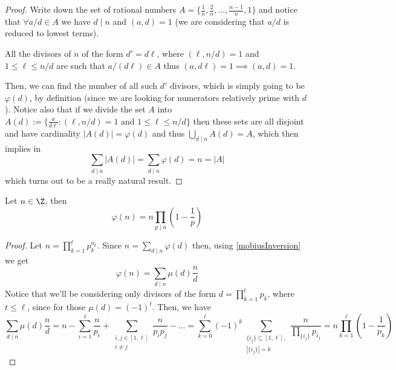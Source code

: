 \begin{proof}
   Write down the set of rational numbers \(A = \{\frac{1}{n}, \frac{2}{n},
   \dots, \frac{n-1}{n}, 1\}\) and notice that \(\forall a/d \in A\) we have \(d
   \mid n\) and \((a, d) = 1\) (we are considering that \(a/d\) is reduced to
   lowest terms).

   All the divisors of \(n\) of the form  \(d' = d \ell\), where
   \((\ell, n/d) = 1\) and \(1 \leqslant \ell \leqslant n/d\) are such that
   \(a/(d\ell) \in A\) thus \((a, d \ell) = 1 \implies (a,d) = 1\).

   Then, we can find the number of all such \(d'\) divisors, which is simply
   going to be \(\varphi(d)\), by definition (since we are looking for
   numerators relatively prime with \(d\)). Notice also that if we divide the
   set \(A\) into \(A(d) := \{\frac{a}{d\ell} : (\ell,n/d) = 1\text{ and } 1
   \leqslant \ell \leqslant n/d \}\) then these sets are all disjoint and have
   cardinality \(|A(d)| = \varphi(d)\) and thus \(\bigcup_{d \mid n} A(d) = A\),
   which then implies in
   \[
      \sum_{d \mid n} |A(d)| = \sum_{d \mid n} \varphi(d) = n = |A|
   \]
   which turns out to be a really natural result.
\end{proof}

\begin{proposition}
   Let \(n \in \Z\), then
   \[
      \varphi(n) = n \prod_{p \mid n} \left( 1 - \frac{1}{p} \right)
   \]
\end{proposition}

\begin{proof}
   Let \(n = \prod_{k = 1}^\ell p_k^{a_k}\). Since \(n = \sum_{d \mid n}
   \varphi(d)\) then, using \ref{mobiusInversion} we get
   \[
      \varphi(n) = \sum_{d \mid n} \mu(d) \frac{n}{d}
   \]
   Notice that we'll be considering only divisors of the form \(d = \prod_{k =
   1}^{t} p_k\), where \(t \leqslant \ell\), since for those \(\mu(d) =
   (-1)^t\). Then, we have
   \[
      \sum_{d \mid n} \mu(d) \frac{n}{d} =
      n - \sum_{i=1}^\ell \frac{n}{p_i} + \sum_{\substack{i,j \in [1, \ell] \\
      i\neq j}} \frac{n}{p_i p_j} - \dots
      =
      \sum_{k=0}^\ell (-1)^k \sum_{\substack{\{i_j\} \subseteq [1, \ell], \\
      |\{i_j\}| = k}} \frac{n}{\prod_{\{i_j\}} p_{i_j}}
      =
      n \prod_{k = 1}^\ell \left( 1 - \frac{1}{p_k} \right)
   \]
\end{proof}


